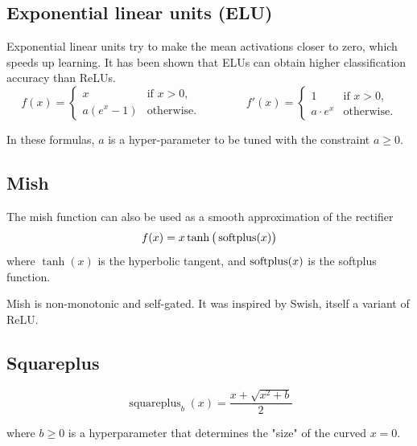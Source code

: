 \subsection{Exponential linear units (ELU) \cite{wiki-Rectifier}}\label{Exponential linear units (ELU)}
Exponential linear units try to make the mean activations closer to zero, which speeds up learning. It has been shown that ELUs can obtain higher classification accuracy than ReLUs.
\[
    {\displaystyle f(x)={\begin{cases}x&{\text{if }}x>0,\\a\left(e^{x}-1\right)&{\text{otherwise}}.\end{cases}}\qquad \qquad f'(x)={\begin{cases}1&{\text{if }}x>0,\\a\cdot e^{x}&{\text{otherwise}}.\end{cases}}}
\]

In these formulas, \(\displaystyle a\) is a hyper-parameter to be tuned with the constraint \(\displaystyle a\geq 0\).

\subsection{Mish \cite{wiki-Rectifier}}\label{Mish}
The mish function can also be used as a smooth approximation of the rectifier
\[
    \displaystyle f(x)=x\tanh {\big (}\operatorname{softplus} (x){\big )}
\]
where \({\displaystyle \tanh(x)}\) is the hyperbolic tangent, and \({\displaystyle \operatorname{softplus}(x)}\) is the softplus function.\par
Mish is non-monotonic and self-gated. It was inspired by Swish, itself a variant of ReLU.

\subsection{Squareplus \cite{wiki-Rectifier}}\label{Squareplus}
\[
    {\displaystyle \operatorname {squareplus} _{b}(x)={\displaystyle\frac {x+{\sqrt {x^{2}+b}}}{2}}}
\]

where \({\displaystyle b\geq 0}\) is a hyperparameter that determines the "size" of the curved \({\displaystyle x=0}\).

